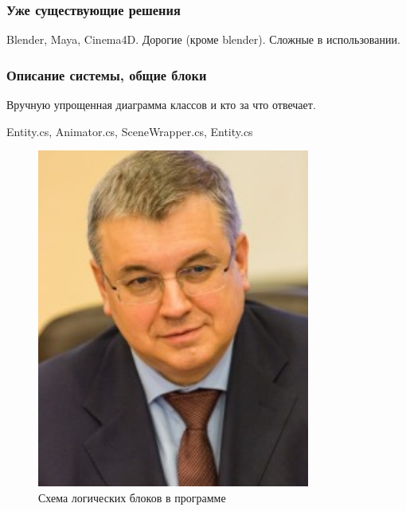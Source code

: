 \documentclass{beamer}
\begin{document}
\begin{frame}
\frametitle{Уже существующие решения}
    Blender, Maya, Cinema4D.
    Дорогие (кроме blender). Сложные в использовании.
    
\end{frame}


\begin{frame}
\frametitle{Описание системы, общие блоки}

	Вручную упрощенная диаграмма классов и кто за что отвечает.

    Entity.cs, Animator.cs, SceneWrapper.cs, Entity.cs

\begin{figure}[h!]
    \centering
    \includegraphics[width=0.8\textwidth]{kouzminov.png}
    \caption{\scriptsize{Схема логических блоков в программе}}
\end{figure}    
    
\end{frame}
\end{document}
